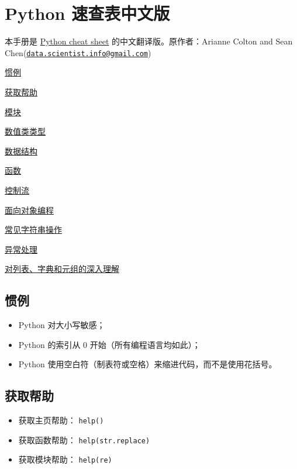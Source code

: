 \documentclass[]{ctexart}
\date{}
\begin{document}
\section{Python 速查表中文版}\label{header-n0}

本手册是 \href{http://datasciencefree.com/python.pdf}{Python cheat
sheet} 的中文翻译版。原作者：Arianne Colton and Sean
Chen(\href{mailto:data.scientist.info@gmail.com}{\nolinkurl{data.scientist.info@gmail.com}})

\protect\hyperlink{header-n27}{惯例}

\protect\hyperlink{header-n38}{获取帮助}

\protect\hyperlink{ux6a21ux5757}{模块}

\protect\hyperlink{header-n64}{数值类类型}

\protect\hyperlink{header-n123}{数据结构}

\protect\hyperlink{header-n212}{函数}

\protect\hyperlink{header-n302}{控制流}

\protect\hyperlink{header-n327}{面向对象编程}

\protect\hyperlink{header-n349}{常见字符串操作}

\protect\hyperlink{header-n351}{异常处理}

\protect\hyperlink{header-n362}{对列表、字典和元组的深入理解}

\hypertarget{header-n27}{\subsection{惯例}\label{header-n27}}

\begin{itemize}
\item
  Python 对大小写敏感；
\item
  Python 的索引从 0 开始（所有编程语言均如此）；
\item
  Python 使用空白符（制表符或空格）来缩进代码，而不是使用花括号。
\end{itemize}

\hypertarget{header-n38}{\subsection{获取帮助}\label{header-n38}}

\begin{itemize}
\item
  获取主页帮助： \texttt{help()}
\item
  获取函数帮助： \texttt{help(str.replace)}
\item
  获取模块帮助： \texttt{help(re)}
\end{itemize}
\end{document}
